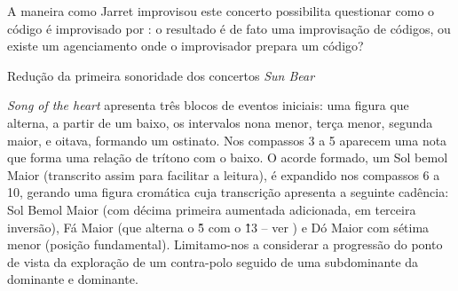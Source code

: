 A maneira como Jarret improvisou este concerto possibilita questionar como o código é improvisado por : o resultado é de fato uma improvisação de códigos, ou existe um agenciamento onde o improvisador prepara um código?

\begin{example}{Redução da primeira sonoridade dos concertos \emph{Sun Bear}}\label{ex:schenker}


\emph{Song of the heart} apresenta três blocos de eventos iniciais: uma figura que alterna, a partir de um baixo, os intervalos nona menor, terça menor, segunda maior, e oitava, formando um ostinato. Nos compassos 3 a 5 aparecem uma nota que forma uma relação de trítono com o baixo. O acorde formado, um Sol bemol Maior (transcrito assim para facilitar a leitura), é expandido nos compassos 6 a 10, gerando uma figura cromática cuja transcrição apresenta a seguinte cadência: Sol Bemol Maior (com décima primeira aumentada adicionada, em terceira inversão), Fá Maior (que alterna o \^5 com o \^13 -- ver \cite{terefenko2004}) e Dó Maior com sétima menor (posição fundamental). Limitamo-nos a considerar a progressão do ponto de vista da exploração de um contra-polo seguido de uma subdominante da dominante e dominante.  


\end{example}
